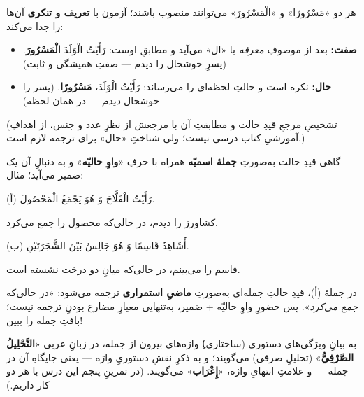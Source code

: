 \begin{JDam}
هر دو «مَسْرُورًا» و «الْمَسْرُورَ» می‌توانند منصوب باشند؛ آزمون با \textbf{تعریف
و تنکری} آن‌ها را جدا می‌کند:
\begin{itemize}
  \item \textbf{صفت:} بعد از موصوفِ \emph{معرفه} با «ال» می‌آید و مطابقِ اوست:
        رَأَيْتُ الْوَلَدَ \textbf{الْمَسْرُورَ}. (پسرِ خوشحال را دیدم — صفتِ
        همیشگی و ثابت)
  \item \textbf{حال:} نکره است و حالتِ لحظه‌ای را می‌رساند:
        رَأَيْتُ الْوَلَدَ، \textbf{مَسْرُورًا}. (پسر را خوشحال \emph{دیدم} —
        در همان لحظه)
\end{itemize}
(تشخیصِ مرجعِ قیدِ حالت و مطابقتِ آن با مرجعش از نظرِ عدد و جنس، از اهدافِ
آموزشیِ کتاب درسی نیست؛ ولی شناختِ «حال» برای ترجمه لازم است.)
\end{JDam}


گاهی قیدِ حالت به‌صورتِ \textbf{جملهٔ اسمیّه} همراه با حرفِ «\textbf{واوِ
حالیّه}» و به دنبالِ آن یک ضمیر می‌آید؛ مثال:

\begin{JMesal}
\Ar (أ) رَأَيْتُ الْفَلَّاحَ وَ هُوَ يَجْمَعُ الْمَحْصُولَ.

کشاورز را دیدم، در حالی‌که محصول را جمع می‌کرد.

\Ar (ب) أُشَاهِدُ قَاسِمًا وَ هُوَ جَالِسٌ بَيْنَ الشَّجَرَتَيْنِ.

قاسم را می‌بینم، در حالی‌که میانِ دو درخت نشسته است.
\end{JMesal}

\begin{JNokte}
در جملهٔ (أ)، قیدِ حالتِ جمله‌ای به‌صورتِ \textbf{ماضیِ استمراری} ترجمه
می‌شود: «در حالی‌که \emph{جمع می‌کرد}». پس حضورِ واوِ حالیّه + ضمیر، به‌تنهایی
معیارِ مضارع بودنِ ترجمه نیست؛ بافتِ جمله را ببین!
\end{JNokte}

\begin{JGood}
به بیانِ ویژگی‌های دستوری (ساختاری)ِ واژه‌های بیرون از جمله، در زبانِ عربی
«\textbf{التَّحْلِيلُ الصَّرْفِيُّ}» (تحلیلِ صرفی) می‌گویند؛ و به ذکرِ نقشِ
دستوریِ واژه — یعنی جایگاهِ آن در جمله — و علامتِ انتهایِ واژه،
«\textbf{إِعْرَاب}» می‌گویند. (در تمرینِ پنجم این درس با هر دو کار داریم.)
\end{JGood}


